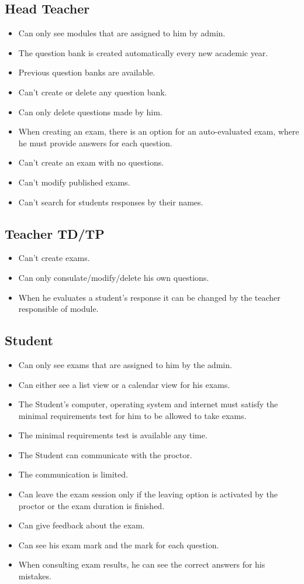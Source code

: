 \documentclass[]{uc2pfecaneva}
\begin{document}
\subsection{Head Teacher}
\begin{itemize}
	\item Can only see modules that are assigned to him by admin.
	\item The question bank is created automatically every new academic year.
	\item Previous question banks are available.
	\item Can’t create or delete any question bank.
	\item Can only delete questions made by him.
	\item When creating an exam, there is an option for an auto-evaluated exam, where he must provide answers for each question.
	\item Can’t create an exam with no questions.
	\item Can’t modify published exams.
	\item Can’t search for students responses by their names.
\end{itemize}

\subsection{Teacher TD/TP}
\begin{itemize}
	\item Can’t create exams.
	\item Can only consulate/modify/delete his own questions.
	\item When he evaluates a student’s response it can be changed by the teacher responsible of module.
\end{itemize}

\subsection{Student}
\begin{itemize}
	\item Can only see exams that are assigned to him by the admin.
	\item Can either see a list view or a calendar view for his exams.
	\item The Student’s computer, operating system and internet  must satisfy the minimal requirements test for him to be allowed to take exams.
	\item The  minimal requirements test is available any time.
	\item The Student can communicate with the proctor.
	\item The communication is limited.
	\item Can leave the exam session only if the leaving option is activated by the proctor or the exam duration is finished.
	\item Can give feedback about the exam.
	\item Can see his exam mark and the mark for each question.
	\item When consulting exam results, he can see the correct answers for his mistakes.
\end{itemize}
\end{document}
